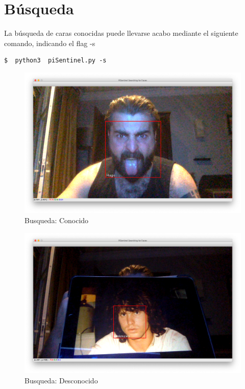 \documentclass[a4paper,11pt]{book}
\begin{document}
\section{Búsqueda}

La búsqueda de caras conocidas puede llevarse acabo mediante el siguiente comando, indicando el flag -s 

\begin{lstlisting}
$  python3  piSentinel.py -s
\end{lstlisting}

\begin{figure}[H]  
\centering 
\includegraphics[scale=0.2]{imagenes/doc_hugo2.png}
\caption{ Busqueda: Conocido}  
\end{figure} 

\begin{figure}[H]  
\centering 
\includegraphics[scale=0.2]{imagenes/doc_jim.png}
\caption{ Busqueda: Desconocido}  
\end{figure} 
\end{document}
